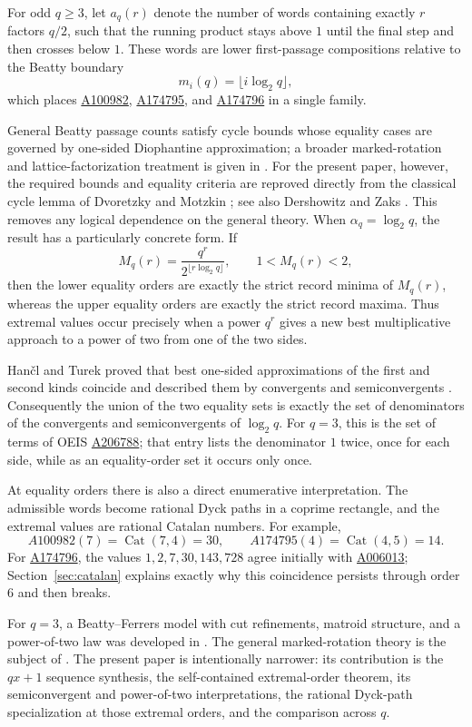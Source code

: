 \documentclass[11pt]{article}
\newcommand{\OEIS}[1]{\href{https://oeis.org/#1}{#1}}
\newcommand{\Cat}{\operatorname{Cat}}
\begin{document}
For odd \(q\geq3\), let \(a_q(r)\) denote the number of words containing
exactly \(r\) factors \(q/2\), such that the running product stays above
\(1\) until the final step and then crosses below \(1\). These words are
lower first-passage compositions relative to the Beatty boundary
\[
 m_i(q)=\lfloor i\log_2q\rfloor,
\]
which places \OEIS{A100982}, \OEIS{A174795}, and \OEIS{A174796} in a
single family.

General Beatty passage counts satisfy cycle bounds whose equality cases are
governed by one-sided Diophantine approximation; a broader marked-rotation
and lattice-factorization treatment is given in \cite{WinBeatty}. For the present paper, however, the required bounds and equality criteria
are reproved directly from the classical cycle lemma of Dvoretzky and
Motzkin \cite{DvoretzkyMotzkin47}; see also Dershowitz and Zaks
\cite{DershowitzZaks90}. This removes any logical dependence on the general
theory. When \(\alpha_q=\log_2q\), the
result has a particularly concrete form. If
\[
 M_q(r)=\frac{q^r}{2^{\lfloor r\log_2q\rfloor}},
 \qquad 1<M_q(r)<2,
\]
then the lower equality orders are exactly the strict record minima of
\(M_q(r)\), whereas the upper equality orders are exactly the strict record
maxima. Thus extremal values occur precisely when a power \(q^r\) gives a
new best multiplicative approach to a power of two from one of the two
sides.

Han\v{c}l and Turek proved that best one-sided approximations of the first
and second kinds coincide and described them by convergents and
semiconvergents \cite[Theorem~4.5]{HanclTurek}. Consequently the union of
the two equality sets is exactly the set of denominators of the convergents
and semiconvergents of \(\log_2q\). For \(q=3\), this is the set of
terms of OEIS \OEIS{A206788}; that entry lists the denominator \(1\)
twice, once for each side, while as an equality-order set it occurs only
once.

At equality orders there is also a direct enumerative interpretation. The
admissible words become rational Dyck paths in a coprime rectangle, and the
extremal values are rational Catalan numbers. For example,
\[
 A100982(7)=\Cat(7,4)=30,\qquad
 A174795(4)=\Cat(4,5)=14.
\]
For \OEIS{A174796}, the values \(1,2,7,30,143,728\) agree initially with
\OEIS{A006013}; Section~\ref{sec:catalan} explains exactly why this
coincidence persists through order \(6\) and then breaks.

For \(q=3\), a Beatty--Ferrers model with cut refinements, matroid structure,
and a power-of-two law was developed in \cite{WinFerrers}. The general
marked-rotation theory is the subject of \cite{WinBeatty}. The present paper
is intentionally narrower: its contribution is the \(qx+1\) sequence
synthesis, the self-contained extremal-order theorem, its semiconvergent and
power-of-two interpretations, the rational Dyck-path specialization at those
extremal orders, and the comparison across \(q\).
\end{document}
